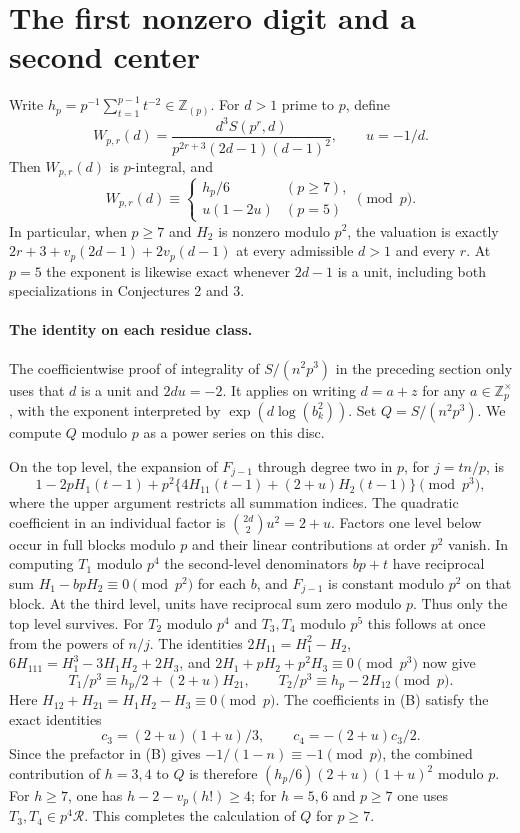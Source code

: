 \documentclass[11pt,a4paper]{article}
\numberwithin{equation}{section}
\begin{document}
\section{The first nonzero digit and a second center}
\label{sec:gs-residue}
Write $h_p=p^{-1}\sum_{t=1}^{p-1}t^{-2}\in\mathbb Z_{(p)}$.
For $d>1$ prime to $p$, define
\[
 W_{p,r}(d)=\frac{d^3 S(p^r,d)}
 {p^{2r+3}(2d-1)(d-1)^2},\qquad u=-1/d .
\]
Then $W_{p,r}(d)$ is $p$-integral, and
\begin{equation}\label{eq:gs-leading}
 W_{p,r}(d)\equiv
 \begin{cases}
 h_p/6 & (p\ge7),\\
 u(1-2u)&(p=5)
 \end{cases}
 \pmod p.
\end{equation}
In particular, when $p\ge7$ and $H_2$ is nonzero modulo $p^2$, the
valuation is exactly $2r+3+v_p(2d-1)+2v_p(d-1)$ at every admissible
$d>1$ and every $r$. At $p=5$ the exponent is likewise exact whenever
$2d-1$ is a unit, including both specializations in Conjectures 2 and 3.

\paragraph{The identity on each residue class.}
The coefficientwise proof of integrality of $S/(n^2p^3)$ in the preceding
section only uses that $d$ is a unit and $2du=-2$. It applies on writing
$d=a+z$ for any $a\in\mathbb Z_p^\times$, with the exponent interpreted
by $\exp(d\log(b_k^2))$. Set $Q=S/(n^2p^3)$. We compute $Q$ modulo $p$
as a power series on this disc.

On the top level, the expansion of $F_{j-1}$ through degree two in
$p$, for $j=t n/p$, is
\[
 1-2pH_1(t-1)+p^2\{4H_{11}(t-1)+(2+u)H_2(t-1)\}\pmod{p^3},
\]
where the upper argument restricts all summation indices. The quadratic
coefficient in an individual factor is $\binom{2d}{2}u^2=2+u$.
Factors one level below occur in full blocks modulo $p$ and their
linear contributions at order $p^2$ vanish. In computing $T_1$
modulo $p^4$ the second-level denominators $bp+t$ have reciprocal sum
$H_1-bpH_2\equiv0\pmod{p^2}$ for each $b$, and $F_{j-1}$ is constant
modulo $p^2$ on that block. At the third level, units have reciprocal
sum zero modulo $p$. Thus only the top level survives. For $T_2$ modulo
$p^4$ and $T_3,T_4$ modulo $p^5$ this follows at once from the powers
of $n/j$. The identities $2H_{11}=H_1^2-H_2$,
$6H_{111}=H_1^3-3H_1H_2+2H_3$, and
$2H_1+pH_2+p^2H_3\equiv0\pmod{p^3}$ now give
\[
 T_1/p^3\equiv h_p/2+(2+u)H_{21},\qquad
 T_2/p^3\equiv h_p-2H_{12}\pmod p .
\]
Here $H_{12}+H_{21}=H_1H_2-H_3\equiv0\pmod p$.
The coefficients in (B) satisfy the exact identities
\[
 c_3=(2+u)(1+u)/3,\qquad c_4=-(2+u)c_3/2.
\]
Since the prefactor in (B) gives $-1/(1-n)\equiv-1\pmod p$,
the combined contribution of $h=3,4$ to $Q$ is therefore
$(h_p/6)(2+u)(1+u)^2$ modulo $p$.
For $h\ge7$, one has $h-2-v_p(h!)\ge4$; for $h=5,6$ and $p\ge7$
one uses $T_3,T_4\in p^4\mathcal R$. This completes the calculation
of $Q$ for $p\ge7$.
\end{document}
